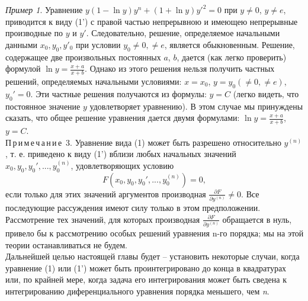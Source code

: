 \documentclass[a5paper,10pt]{book}
\begin{document}
\textit{Пример 1}. Уравнение $y (1-\ln y) y^n + (1+\ln y) y'^2 = 0$ при $y \neq 0$, $y \neq e$, приводится к виду (1') с правой частью непрерывною и имеющею непрерывные производные по $y$ и $y'$. Следовательно, решение, определяемое начальными данными $x_{0}, y_{0}, y'_{0}$ при условии $ y_{0} \neq 0, \neq e$, является обыкновенным. Решение, содержащее две произвольных постоянных $a$, $b$, дается (как легко проверить) формулой  $ \ln y = \frac{x+a}{x+b}$. Однако из этого решения нельзя получить частных решений, определяемых начальными условиями: $ x=x_{0}$, $y=y_{0}( \neq 0, \neq e)$, $y_{0}'=0$. Эти частные решения получаются из формулы: $y=C$ (легко видеть, что постоянное значение $y$ удовлетворяет уравнению). В этом случае мы принуждены сказать, что общее решение уравнения дается двумя формулами: $ \ln y = \frac{x+a}{x+b}$, $y=C$. \\
П\,р\,и\,м\,е\,ч\,а\,н\,и\,е\, 3. Уравнение вида (1) может быть разрешено относительно $y^{(n)}$, т. е. приведено к виду (1') вблизи любых начальных значений $x_{0}, y_{0}, y_{0}', . . . , y_{0}^{(n)}$, удовлетворяющих условию
$$ F(x_{0}, y_{0}, y_{0}', . . . , y_{0}^{(n)}) = 0, $$
если только для этих значений аргументов производная $ \frac{\partial F}{\partial y^{(n)}} \neq 0$. Все последующие рассуждения имеют силу только в этом предположении. Рассмотрение тех значений, для которых производная $ \frac{\partial F}{\partial y^{(n)}}$ обращается в нуль, привело бы к рассмотрению особых решений уравнения n-го порядка; мы на этой теории останавливаться не будем. \\
\indent
Дальнейшей целью настоящей главы будет -- установить некоторые случаи, когда уравнение (1) или (1') может быть проинтегрировано до конца в квадратурах или, по крайней мере, когда задача его интегрирования может быть сведена к интегрированию диференциального уравнения порядка меньшего, чем \textit{n}.
\end{document}
